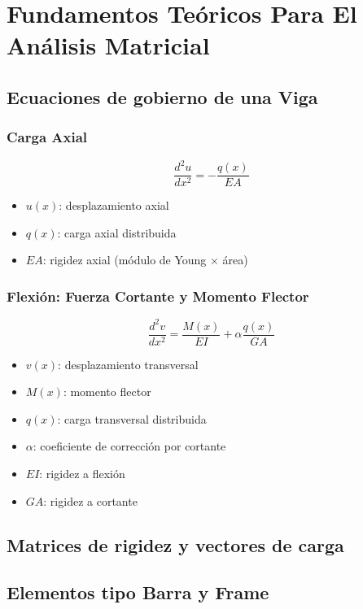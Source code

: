 \chapter{Fundamentos Teóricos Para El Análisis Matricial}

\section{Ecuaciones de gobierno de una Viga}
\subsection{Carga Axial}
\begin{equation}
\frac{d^2 u}{dx^2} = -\frac{q(x)}{EA}
\end{equation}
\begin{itemize}
  \item $u(x)$: desplazamiento axial
  \item $q(x)$: carga axial distribuida
  \item $EA$: rigidez axial (módulo de Young $\times$ área)
\end{itemize}

\subsection{Flexión: Fuerza Cortante y Momento Flector}
\begin{equation}
\frac{d^2 v}{dx^2} = \frac{M(x)}{EI} + \alpha \frac{q(x)}{GA}
\end{equation}
\begin{itemize}
  \item $v(x)$: desplazamiento transversal
  \item $M(x)$: momento flector
  \item $q(x)$: carga transversal distribuida
  \item $\alpha$: coeficiente de corrección por cortante
  \item $EI$: rigidez a flexión
  \item $GA$: rigidez a cortante
\end{itemize}


\section{Matrices de rigidez y vectores de carga}

\section{Elementos tipo Barra y Frame}
